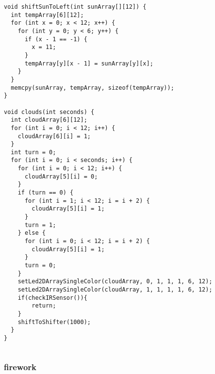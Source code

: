 \documentclass[12pt,a4paper]{article}
\begin{document}
\begin{lstlisting}[language=Arduino]
void shiftSunToLeft(int sunArray[][12]) {
  int tempArray[6][12];
  for (int x = 0; x < 12; x++) {
    for (int y = 0; y < 6; y++) {
      if (x - 1 == -1) {
        x = 11;
      }
      tempArray[y][x - 1] = sunArray[y][x];
    }
  }
  memcpy(sunArray, tempArray, sizeof(tempArray));
}

void clouds(int seconds) {
  int cloudArray[6][12];
  for (int i = 0; i < 12; i++) {
    cloudArray[6][i] = 1;
  }
  int turn = 0;
  for (int i = 0; i < seconds; i++) {
    for (int i = 0; i < 12; i++) {
      cloudArray[5][i] = 0;
    }
    if (turn == 0) {
      for (int i = 1; i < 12; i = i + 2) {
        cloudArray[5][i] = 1;
      }
      turn = 1;
    } else {
      for (int i = 0; i < 12; i = i + 2) {
        cloudArray[5][i] = 1;
      }
      turn = 0;
    }
    setLed2DArraySingleColor(cloudArray, 0, 1, 1, 1, 6, 12);
    setLed2DArraySingleColor(cloudArray, 1, 1, 1, 1, 6, 12);
    if(checkIRSensor()){
        return;
    }
    shiftToShifter(1000);
  }
}
    
\end{lstlisting}

\subsubsection{firework}
\end{document}
